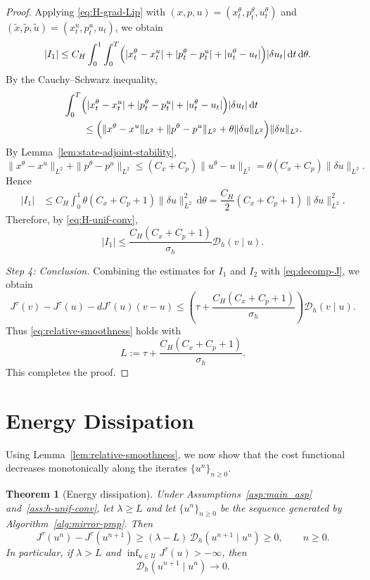 \documentclass[11pt]{amsart}
\theoremstyle{plain}
\newtheorem{theorem}{Theorem}
\theoremstyle{definition}
\theoremstyle{remark}
\newcommand{\dd}{\,\mathrm{d}}
\begin{document}
\begin{proof}
Applying \eqref{eq:H-grad-Lip} with $(x,p,u)=(x_t^\theta,p_t^\theta,u_t^\theta)$ and
$(\tilde x,\tilde p,\tilde u)=(x_t^u,p_t^u,u_t)$, we obtain
\[
\begin{aligned}
|I_1|
&\le
C_H\int_0^1\int_0^T
\Bigl(
|x_t^\theta-x_t^u|
+
|p_t^\theta-p_t^u|
+
|u_t^\theta-u_t|
\Bigr)|\delta u_t|\dd t\dd \theta.
\end{aligned}
\]
By the Cauchy--Schwarz inequality,
\begin{align*}
    & \int_0^T
\Bigl(
|x_t^\theta-x_t^u|
+
|p_t^\theta-p_t^u|
+
|u_t^\theta-u_t|
\Bigr)|\delta u_t|\dd t \\
& \qquad \leq \Bigl( \| x^\theta - x^u\|_{L^2} + \| p^\theta - p^u \|_{L^2} + \theta \|\delta u\|_{L^2} \Bigr) \| \delta u\|_{L^2}.
\end{align*}
By Lemma~\ref{lem:state-adjoint-stability},
\[
\|x^\theta-x^u\|_{L^2}
+
\|p^\theta-p^u\|_{L^2}
\le
(C_x + C_p) \|u^\theta-u\|_{L^2}
=
\theta (C_x+ C_p) \|\delta u\|_{L^2}.
\]
Hence
\[
\begin{aligned}
|I_1|
&\le
C_H\int_0^1
\theta (C_x + C_p + 1) \| \delta u\|_{L^2}^2 \dd\theta
=
\dfrac{C_H}{2} (C_x + C_p+ 1) \| \delta u\|_{L^2}^2.
\end{aligned}
\]
Therefore, by \eqref{eq:H-unif-conv},
\[
|I_1|
\le
\frac{C_H(C_x + C_p +1)}{\sigma_h} \mathcal{D}_h(v\mid u).
\]

\smallskip

\noindent
\textit{Step 4: Conclusion.}
Combining the estimates for $I_1$ and $I_2$ with \eqref{eq:decomp-J}, we obtain
\[
J^\tau(v)-J^\tau(u)-dJ^\tau(u)(v-u)
\le
\left(
\tau+\frac{C_H(C_x + C_p +1)}{\sigma_h}
\right)\mathcal{D}_h(v\mid u).
\]
Thus \eqref{eq:relative-smoothness} holds with
\[
L
:=
\tau+\frac{C_H(C_x + C_p +1)}{\sigma_h}.
\]
This completes the proof.
\end{proof}

\section{Energy Dissipation}\label{sec:energy}

Using Lemma~\ref{lem:relative-smoothness}, we now show that the cost functional decreases monotonically along the iterates $\{u^n\}_{n \geq 0}$.

\begin{theorem}[Energy dissipation]\label{thm:energy}
Under Assumptions~\ref{asp:main_asp} and~\ref{ass:h-unif-conv}, let $\lambda\ge L$ and let $\{u^n\}_{n\ge 0}$ be the sequence generated by Algorithm~\ref{alg:mirror-pmp}. Then
\begin{equation}\label{eq:bregman-diss}
J^\tau(u^n)-J^\tau(u^{n+1})
\ge
(\lambda-L)\,\mathcal{D}_h(u^{n+1}\mid u^n) \geq 0, \qquad n\ge 0.
\end{equation}
In particular, if $\lambda > L$ and $\inf_{u\in\mathcal U}J^\tau(u)>-\infty$, then
\begin{equation}\label{eq:bregman-to-zero}
\mathcal{D}_h(u^{n+1}\mid u^n)\to 0.
\end{equation}
\end{theorem}
\end{document}
